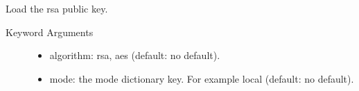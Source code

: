 \documentclass[letterpaper,10pt,english]{sphinxmanual}
\begin{document}
\begin{fulllineitems}
\begin{fulllineitems}
\label{base_classes:bhp_crypto.classes.Cryptor.set_public_key}
Load the rsa public key.
\begin{description}
\item[{Keyword Arguments}] \leavevmode\begin{itemize}
\item {} 
algorithm: rsa, aes (default: no default).

\item {} 
mode: the mode dictionary key. For example local (default: no default).

\end{itemize}

\end{description}

\end{fulllineitems}


\end{fulllineitems}

\end{document}
